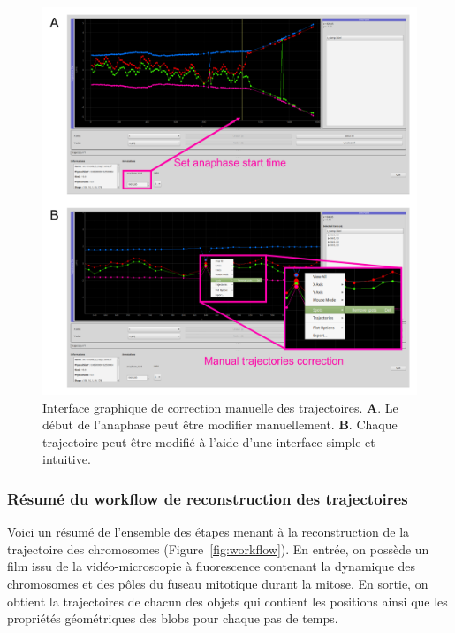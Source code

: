 \documentclass[12pt,a4paper,twoside,openright]{book}
\begin{document}
\begin{figure}[htbp]
\centering
\includegraphics{figures/results/imaging/gui.png}
\caption[Interface graphique de correction manuelle des trajectoires]{\label{fig:gui}Interface
graphique de correction manuelle des trajectoires. \textbf{A}. Le début
de l'anaphase peut être modifier manuellement. \textbf{B}. Chaque
trajectoire peut être modifié à l'aide d'une interface simple et
intuitive.}
\end{figure}

\subsubsection{Résumé du workflow de reconstruction des
trajectoires}\label{ruxe9sumuxe9-du-workflow-de-reconstruction-des-trajectoires}

Voici un résumé de l'ensemble des étapes menant à la reconstruction de
la trajectoire des chromosomes (Figure~\ref{fig:workflow}). En entrée,
on possède un film issu de la vidéo-microscopie à fluorescence contenant
la dynamique des chromosomes et des pôles du fuseau mitotique durant la
mitose. En sortie, on obtient la trajectoires de chacun des objets qui
contient les positions ainsi que les propriétés géométriques des blobs
pour chaque pas de temps.
\end{document}
